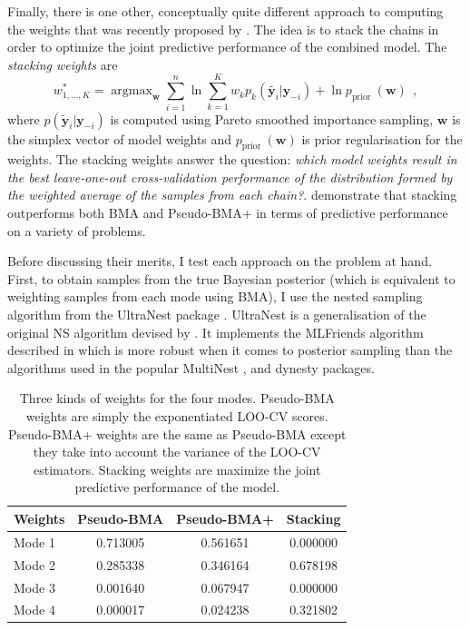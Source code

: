 \documentclass[12pt,dvipsnames]{report}
\newcommand{\ssf}[1]{\textsf{#1}}
\renewcommand{\vec}[1]{\boldsymbol{\mathbf{#1}}}
\newcommand{\hquad}{~~}
\begin{document}
Finally, there is one other, conceptually quite different approach to computing the weights 
that was recently proposed by 
\citet{arXiv:2006.12335}. The idea is to stack the chains in order to optimize the joint 
predictive performance of the combined model. The \emph{stacking weights} are 
\begin{equation}
w_{1, \ldots, K}^*=\operatorname{argmax}_{\vec{w}} \sum_{i=1}^n \ln\sum_{k=1}^K w_k p_k\left(\tilde{\vec y_i} |\vec y_{-i}\right)+\ln p_{\text {prior }}(\mathbf{w})
\hquad,
\label{eq:stacking_weights}
\end{equation}
where $p(\tilde{\vec y}_{i}|\vec y_{-i})$ is computed using Pareto smoothed importance 
sampling, $\vec w$ is the simplex vector of model weights and 
$p_{\text {prior }}(\mathbf{w})$ is prior regularisation for the weights.
The stacking weights answer the question: \emph{which model weights result in 
the best leave-one-out cross-validation performance of the distribution formed by 
the weighted average of the samples from each chain?}. \citet{arXiv:2006.12335} demonstrate
that stacking outperforms both BMA and Pseudo-BMA+ in terms of predictive performance 
on a variety of problems.

Before discussing their merits, I test each approach on the problem at hand. First, 
to obtain samples from the true Bayesian posterior (which is equivalent to weighting 
samples from each mode using BMA), I use the nested sampling algorithm 
from the \ssf{UltraNest} package \citep{2021JOSS....6.3001B}. \ssf{UltraNest} is a 
generalisation of the original NS algorithm devised by \citet{2004AIPC..735..395S}.
It implements the \ssf{MLFriends} algorithm described in 
\citet{2016S&C....26..383B,10.2307/26874452}
which is more robust when it comes to posterior sampling than 
the algorithms used in the popular \ssf{MultiNest} \citep{2009MNRAS.398.1601F},
and \ssf{dynesty} \citep{2020MNRAS.493.3132S} packages.


\begin{table}[h!]
\centering
\begin{tabular}{l c c c} 
 \toprule
Weights & Pseudo-BMA &  Pseudo-BMA+ & Stacking\\
 \midrule
 Mode 1 &  0.713005 &  0.561651 &  0.000000\\
 Mode 2 & 0.285338 & 0.346164 &  0.678198\\
 Mode 3 & 0.001640 & 0.067947 & 0.000000\\
 Mode 4 & 0.000017 & 0.024238 & 0.321802\\
\bottomrule
\end{tabular}
\caption{Three kinds of weights for the four modes. Pseudo-BMA weights are simply 
the exponentiated LOO-CV scores. Pseudo-BMA+ weights are the same as Pseudo-BMA 
except they take into account the variance of the LOO-CV estimators. Stacking weights 
are  maximize the joint predictive performance of the model.}
\label{tab:weights}
\end{table}
\end{document}
